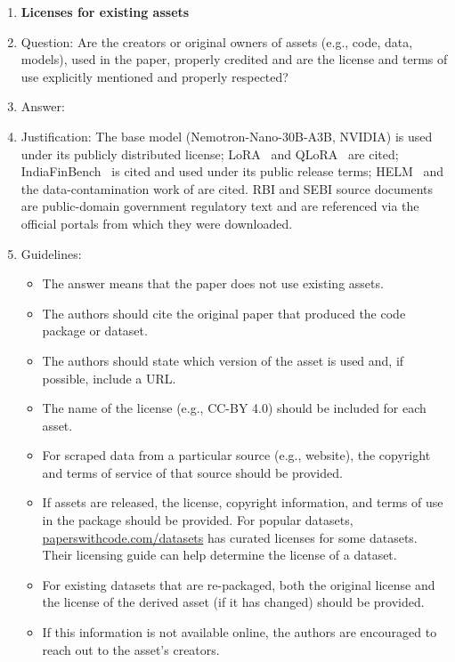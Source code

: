 \begin{enumerate}
\item {\bf Licenses for existing assets}
    \item[] Question: Are the creators or original owners of assets (e.g., code, data, models), used in the paper, properly credited and are the license and terms of use explicitly mentioned and properly respected?
    \item[] Answer: \answerYes{}
    \item[] Justification: The base model (Nemotron-Nano-30B-A3B, NVIDIA) is used under its publicly distributed license; LoRA~\citep{hu2021lora} and QLoRA~\citep{dettmers2023qlora} are cited; IndiaFinBench~\citep{pall2026indiafinbench} is cited and used under its public release terms; HELM~\citep{liang2022helm} and the data-contamination work of \citet{magar2022data} are cited. RBI and SEBI source documents are public-domain government regulatory text and are referenced via the official portals from which they were downloaded.
    \item[] Guidelines:
    \begin{itemize}
        \item The answer \answerNA{} means that the paper does not use existing assets.
        \item The authors should cite the original paper that produced the code package or dataset.
        \item The authors should state which version of the asset is used and, if possible, include a URL.
        \item The name of the license (e.g., CC-BY 4.0) should be included for each asset.
        \item For scraped data from a particular source (e.g., website), the copyright and terms of service of that source should be provided.
        \item If assets are released, the license, copyright information, and terms of use in the package should be provided. For popular datasets, \url{paperswithcode.com/datasets} has curated licenses for some datasets. Their licensing guide can help determine the license of a dataset.
        \item For existing datasets that are re-packaged, both the original license and the license of the derived asset (if it has changed) should be provided.
        \item If this information is not available online, the authors are encouraged to reach out to the asset's creators.
    \end{itemize}


\end{enumerate}
